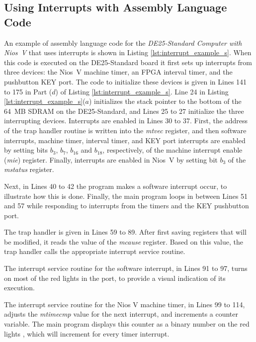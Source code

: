 \documentclass[11pt, twoside, pdftex]{article}
\newcommand{\commonFiles}{../../../common/doc}
\newcommand{\DEBoard}{DE25-Standard}
\newcommand{\systemNameFull}{DE25-Standard Computer with Nios~V}
\begin{document}





\subsection{Using Interrupts with Assembly Language Code}

An example of assembly language code for the {\it \systemNameFull} that uses interrupts is
shown in Listing \ref{lst:interrupt_example_s}. When this code is executed on the
{\DEBoard} board it first sets up interrupts from three devices: the Nios~V machine timer, 
an FPGA interval timer, and the pushbutton KEY port. The code to initialize these devices
is given in Lines 141 to 175 in Part ($d$) of Listing \ref{lst:interrupt_example_s}. 
Line 24 in Listing \ref{lst:interrupt_example_s}($a$) initializes the stack pointer to
the bottom of the 64~MB SDRAM on the {\DEBoard}, and Lines 25 to 27 initialize the
three interrupting devices. Interrupts are enabled in Lines 30 to 37. First, the address of
the trap handler routine is written into the {\it mtvec} register, and then software
interrupts, machine timer, interval timer, and KEY port interrupts are
enabled by setting bits $b_3$, $b_7$, $b_{16}$ and $b_{18}$, respectively, of the 
machine interrupt enable ({\it mie}) register. 
Finally, interrupts are enabled in Nios~V by setting bit $b_3$ of the {\it mstatus} register.

Next, in Lines 40 to 42 the program makes a software 
interrupt occur, to illustrate how this is done. Finally, the main program loops in
between Lines 51 and 57 while responding to interrupts from the timers and the 
KEY pushbutton port. 

The trap handler is given in Lines 59 to 89. After first saving registers that will be
modified, it reads the value of the {\it mcause} register. Based on this value, the trap
handler calls the appropriate interrupt service routine. 

The interrupt service routine for the software interrupt, in Lines 91 to 97, 
turns on most of the red lights in the  port, to provide a visual indication of 
its execution. 

The interrupt service routine for the Nios V machine timer, in Lines 99 to 114,
adjusts the {\it mtimecmp} value for the next interrupt, and 
increments a counter variable. The main program displays this counter as a binary number 
on the red lights , which will increment for every timer interrupt.
\end{document}
